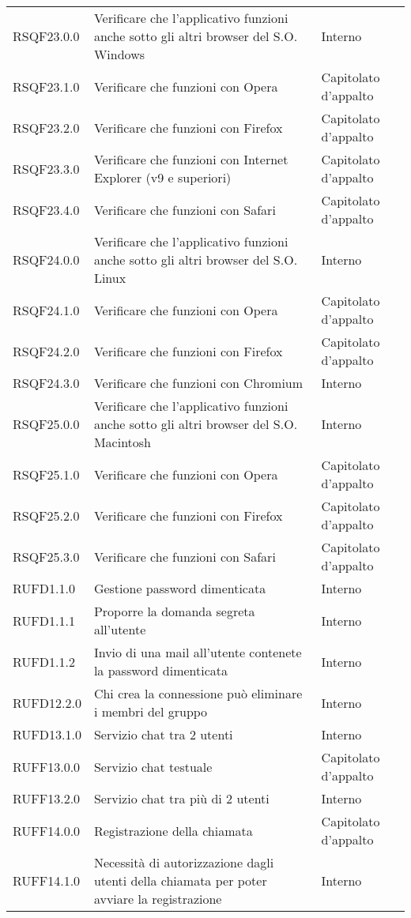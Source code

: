 \begin{longtable}{lp{}l}
RSQF23.0.0 & Verificare che l'applicativo funzioni anche sotto gli altri browser del S.O. Windows & Interno \\
RSQF23.1.0 & Verificare che funzioni con Opera & Capitolato d'appalto \\
RSQF23.2.0 & Verificare che funzioni con Firefox & Capitolato d'appalto \\
RSQF23.3.0 & Verificare che funzioni con Internet Explorer (v9 e superiori) & Capitolato d'appalto \\
RSQF23.4.0 & Verificare che funzioni con Safari & Capitolato d'appalto \\
RSQF24.0.0 & Verificare che l'applicativo funzioni anche sotto gli altri browser del S.O. Linux & Interno \\
RSQF24.1.0 & Verificare che funzioni con Opera & Capitolato d'appalto \\
RSQF24.2.0 & Verificare che funzioni con Firefox & Capitolato d'appalto \\
RSQF24.3.0 & Verificare che funzioni con Chromium & Interno \\
RSQF25.0.0 & Verificare che l'applicativo funzioni anche sotto gli altri browser del S.O. Macintosh & Interno \\
RSQF25.1.0 & Verificare che funzioni con Opera & Capitolato d'appalto \\
RSQF25.2.0 & Verificare che funzioni con Firefox & Capitolato d'appalto \\
RSQF25.3.0 & Verificare che funzioni con Safari & Capitolato d'appalto \\
RUFD1.1.0 & Gestione password dimenticata & Interno \\
RUFD1.1.1 & Proporre la domanda segreta all'utente & Interno \\
RUFD1.1.2 & Invio di una mail all'utente contenete la password dimenticata & Interno \\
RUFD12.2.0 & Chi crea la connessione può eliminare i membri del gruppo & Interno \\
RUFD13.1.0 & Servizio chat tra 2 utenti & Interno \\
RUFF13.0.0 & Servizio chat testuale & Capitolato d'appalto \\
RUFF13.2.0 & Servizio chat tra più di 2 utenti & Interno \\
RUFF14.0.0 & Registrazione della chiamata & Capitolato d'appalto \\
RUFF14.1.0 & Necessità di autorizzazione dagli utenti della chiamata per poter avviare la registrazione & Interno \\

\end{longtable}
